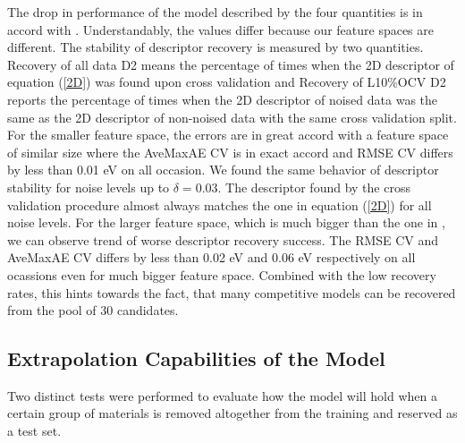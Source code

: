 \documentclass[11pt,oneside,czech,american]{book} %
\theoremstyle{definition} %
\theoremstyle{definition}
\begin{document}
The drop in performance of the model described by the four quantities is in accord with \parencite{ghiringhelli17}. Understandably, the values differ because our feature spaces are different. The stability of descriptor recovery is measured by two quantities. Recovery of all data D2 means the percentage of times when the 2D descriptor of equation (\ref{2D}) was found upon cross validation and Recovery of L10\%OCV D2 reports the percentage of times when the 2D descriptor of noised data was the same as the 2D descriptor of non-noised data with the same cross validation split. For the smaller feature space, the errors are in great accord with a feature space of similar size \parencite{ghiringhelli17} where the AveMaxAE CV is in exact accord and RMSE CV differs by less than 0.01 eV on all occasion. We found the same behavior of descriptor stability for noise levels up to $\delta=0.03$. The descriptor found by the cross validation procedure almost always matches the one in equation (\ref{2D}) for all noise levels. For the larger feature space, which is much bigger than the one in \parencite{ghiringhelli17}, we can observe trend of worse descriptor recovery success. The RMSE CV and AveMaxAE CV differs by less than 0.02 eV and 0.06 eV respectively on all ocassions even for much bigger feature space. Combined with the low recovery rates, this hints towards the fact, that many competitive models can be recovered from the pool of 30 candidates.
\subsection{Extrapolation Capabilities of the Model}
Two distinct tests were performed to evaluate how the model will hold when a certain group of materials is removed altogether from the training and reserved as a test set.
\end{document}
